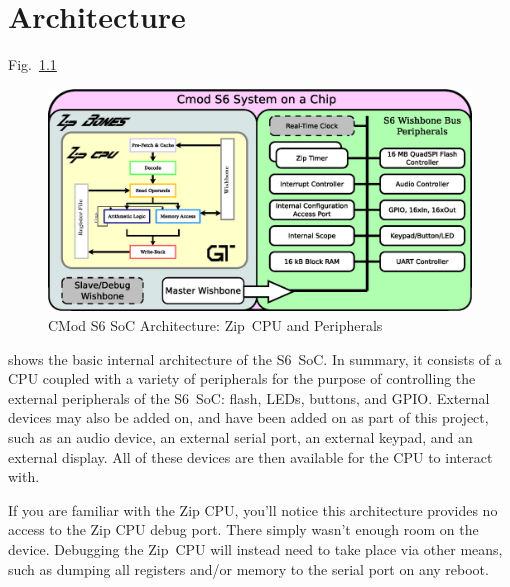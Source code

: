 \documentclass{gqtekspec}
\begin{document}
\chapter{Architecture}
Fig.~\ref{fig:architecture}
\begin{figure}\begin{center}
\includegraphics[width=5in]{../gfx/s6bones.eps}
\caption{CMod S6 SoC Architecture: Zip~CPU and
	Peripherals}\label{fig:architecture}
\end{center}\end{figure}
shows the basic internal architecture of the S6~SoC.  In summary, it consists
of a CPU
coupled with a variety of peripherals for the purpose of controlling the
external peripherals of the S6~SoC: flash, LEDs, buttons, and GPIO.  External
devices may also be added on, and have been added on as part of this project,
such as an audio device, an external serial port, an external keypad, and an
external display.  All of these devices are then available for the CPU to
interact with.

If you are familiar with the Zip CPU, you'll notice this architecture provides
no access to the Zip CPU debug port.  There simply wasn't enough room on the
device.  Debugging the Zip~CPU will instead need to take place via other means,
such as dumping all registers and/or memory to the serial port on any reboot.
\end{document}
